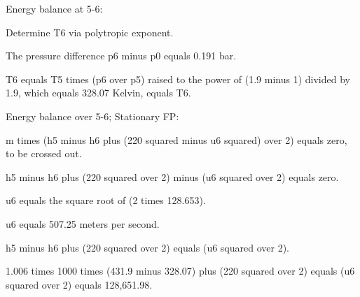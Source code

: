 Energy balance at 5-6:

Determine T6 via polytropic exponent.

The pressure difference p6 minus p0 equals 0.191 bar.

T6 equals T5 times (p6 over p5) raised to the power of (1.9 minus 1) divided by 1.9, which equals 328.07 Kelvin, equals T6.

Energy balance over 5-6; Stationary FP:

m times (h5 minus h6 plus (220 squared minus u6 squared) over 2) equals zero, to be crossed out.

h5 minus h6 plus (220 squared over 2) minus (u6 squared over 2) equals zero.

u6 equals the square root of (2 times 128.653).

u6 equals 507.25 meters per second.

h5 minus h6 plus (220 squared over 2) equals (u6 squared over 2).

1.006 times 1000 times (431.9 minus 328.07) plus (220 squared over 2) equals (u6 squared over 2) equals 128,651.98.